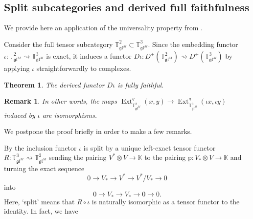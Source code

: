 \documentclass[11pt]{article}
\theoremstyle{plain}
\newtheorem{theorem}[lemma]{Theorem}
\theoremstyle{nonumberplain}
\theoremstyle{plain}
\newtheorem{remark}[lemma]{Remark}
\theoremstyle{nonumberplain}
\newcommand\bK{{\mathbb K}}
\newcommand\bT{{\mathbb T}}
\newcommand\fgl{\mathfrak{gl}}
\DeclareMathOperator{\Ext}{\mathrm{Ext}}
\begin{document}
\subsection{Split subcategories and derived full faithfulness}
\label{subsec.3d_split-subc-deriv}


We provide here an application of the universality property from . 




Consider the full tensor subcategory $\bT^2_{\fgl^M}\subset \bT^3_{\fgl^M}$. Since the embedding functor $\iota:\bT^2_{\fgl^M}\rightsquigarrow \bT^3_{\fgl^M}$ is exact, it induces a functor $D\iota:D^+\left(\bT^2_{\fgl^M}\right)\rightsquigarrow D^+\left(\bT^3_{\fgl^M}\right)$ by applying $\iota$ straightforwardly to complexes.%


\begin{theorem}\label{th.3d_derived_ff}
The derived functor $D\iota$ is fully faithful.   
\end{theorem}


\begin{remark}\label{re.3d_faith}
  In other words, the maps $\Ext^q_{\bT^2_{\fgl^M}}(x,y)\to \Ext^q_{\bT^3_{\fgl^M}}(\iota x,\iota y)$ induced by $\iota$ are isomorphisms. 
\end{remark}



We postpone the proof briefly in order to make a few remarks. 

By  the inclusion functor $\iota$ is split by a unique left-exact tensor functor $R:\bT^3_{\fgl^M}\rightsquigarrow \bT^2_{\fgl^M}$ sending the pairing $V^*\otimes V\to \bK$ to the pairing $\mathrm{p}:V_*\otimes V\to \bK$ and turning the exact sequence 
\begin{equation*}
  0\to V_*\to V^*\to V^*/V_*\to 0
\end{equation*}
into 
\begin{equation*}
  0\to V_*\to V_*\to 0\to 0.
\end{equation*}
Here, `split' means that $R\circ\iota$ is naturally isomorphic as a tensor functor to the identity. In fact, we have 
\end{document}
